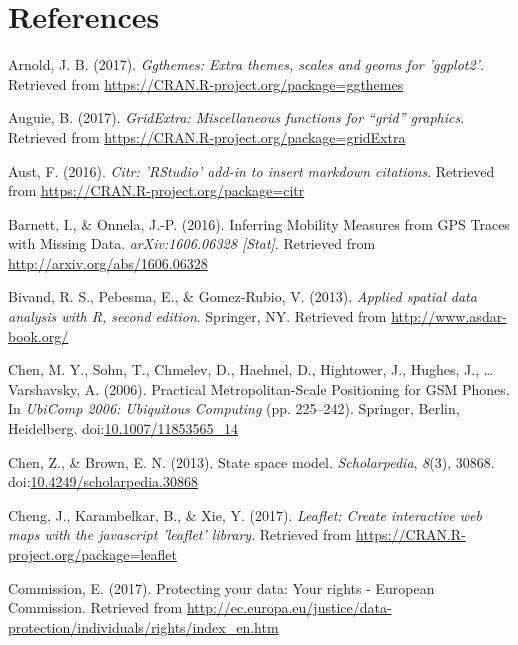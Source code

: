 \documentclass[english,man]{apa6}
\theoremstyle{definition}
\theoremstyle{definition}
\theoremstyle{definition}
\theoremstyle{remark}
\begin{document}
\newpage

\section{References}\label{references}

\setlength{\parindent}{-0.5in} \setlength{\leftskip}{0.5in}

\hypertarget{refs}{}
\hypertarget{ref-ggthemes}{}
Arnold, J. B. (2017). \emph{Ggthemes: Extra themes, scales and geoms for
'ggplot2'}. Retrieved from
\url{https://CRAN.R-project.org/package=ggthemes}

\hypertarget{ref-gridExtra}{}
Auguie, B. (2017). \emph{GridExtra: Miscellaneous functions for ``grid''
graphics}. Retrieved from
\url{https://CRAN.R-project.org/package=gridExtra}

\hypertarget{ref-citr}{}
Aust, F. (2016). \emph{Citr: 'RStudio' add-in to insert markdown
citations}. Retrieved from \url{https://CRAN.R-project.org/package=citr}

\hypertarget{ref-barnett_inferring_2016}{}
Barnett, I., \& Onnela, J.-P. (2016). Inferring Mobility Measures from
GPS Traces with Missing Data. \emph{arXiv:1606.06328 {[}Stat{]}}.
Retrieved from \url{http://arxiv.org/abs/1606.06328}

\hypertarget{ref-sp2}{}
Bivand, R. S., Pebesma, E., \& Gomez-Rubio, V. (2013). \emph{Applied
spatial data analysis with R, second edition}. Springer, NY. Retrieved
from \url{http://www.asdar-book.org/}

\hypertarget{ref-chen_practical_2006}{}
Chen, M. Y., Sohn, T., Chmelev, D., Haehnel, D., Hightower, J., Hughes,
J., \ldots{} Varshavsky, A. (2006). Practical Metropolitan-Scale
Positioning for GSM Phones. In \emph{UbiComp 2006: Ubiquitous Computing}
(pp. 225--242). Springer, Berlin, Heidelberg.
doi:\href{https://doi.org/10.1007/11853565_14}{10.1007/11853565\_14}

\hypertarget{ref-chen_state_2013}{}
Chen, Z., \& Brown, E. N. (2013). State space model.
\emph{Scholarpedia}, \emph{8}(3), 30868.
doi:\href{https://doi.org/10.4249/scholarpedia.30868}{10.4249/scholarpedia.30868}

\hypertarget{ref-leaflet}{}
Cheng, J., Karambelkar, B., \& Xie, Y. (2017). \emph{Leaflet: Create
interactive web maps with the javascript 'leaflet' library}. Retrieved
from \url{https://CRAN.R-project.org/package=leaflet}

\hypertarget{ref-commission_protecting_2017}{}
Commission, E. (2017). Protecting your data: Your rights - European
Commission. Retrieved from
\url{http://ec.europa.eu/justice/data-protection/individuals/rights/index_en.htm}
\end{document}
